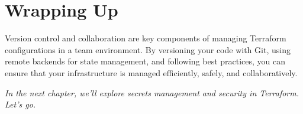 \section{Wrapping Up}

Version control and collaboration are key components of managing Terraform configurations in a team environment. By versioning your code with Git, using remote backends for state management, and following best practices, you can ensure that your infrastructure is managed efficiently, safely, and collaboratively.

\vspace{1em}

\textit{In the next chapter, we'll explore secrets management and security in Terraform. Let's go.}
